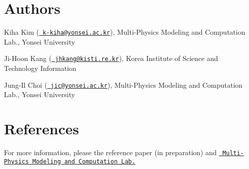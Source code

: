 \section*{Authors}


\begin{DoxyItemize}
\item Kiha Kim (\href{mailto:k-kiha@yonsei.ac.kr}{\texttt{ k-\/kiha@yonsei.\+ac.\+kr}}), Multi-\/\+Physics Modeling and Computation Lab., Yonsei University
\item Ji-\/\+Hoon Kang (\href{mailto:jhkang@kisti.re.kr}{\texttt{ jhkang@kisti.\+re.\+kr}}), Korea Institute of Science and Technology Information
\item Jung-\/\+Il Choi (\href{mailto:jic@yonsei.ac.kr}{\texttt{ jic@yonsei.\+ac.\+kr}}), Multi-\/\+Physics Modeling and Computation Lab., Yonsei University
\end{DoxyItemize}

\section*{References}

For more information, please the reference paper (in preparation) and \href{https://www.mpmc.yonsei.ac.kr/}{\texttt{ Multi-\/\+Physics Modeling and Computation Lab.}} 